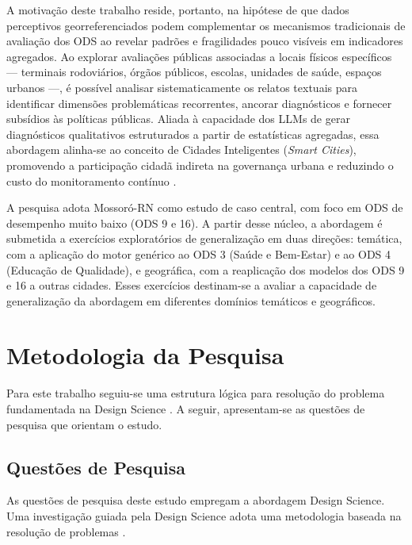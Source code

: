{A motivação deste trabalho reside, portanto, na hipótese de que dados
perceptivos georreferenciados podem complementar os mecanismos
tradicionais de avaliação dos ODS ao revelar padrões e fragilidades pouco
visíveis em indicadores agregados. Ao explorar avaliações públicas
associadas a locais físicos específicos --- terminais rodoviários, órgãos
públicos, escolas, unidades de saúde, espaços urbanos ---, é possível
analisar sistematicamente os relatos textuais para identificar dimensões
problemáticas recorrentes, ancorar diagnósticos e fornecer subsídios às políticas públicas. Aliada à capacidade dos
\gls{LLM}s de gerar diagnósticos qualitativos estruturados a partir de
estatísticas agregadas, essa abordagem alinha-se ao conceito de Cidades
Inteligentes (\textit{Smart Cities}), promovendo a participação cidadã
indireta na governança urbana e reduzindo o custo do monitoramento
contínuo \cite{fu2023}.

A pesquisa adota Mossoró-RN como estudo de caso central, com foco em ODS de
desempenho muito baixo (ODS 9 e 16). A partir desse núcleo,
a abordagem é submetida a exercícios exploratórios de generalização em duas
direções: temática, com a aplicação do motor genérico ao ODS 3 (Saúde e
Bem-Estar) e ao ODS 4 (Educação de Qualidade), e geográfica, com a reaplicação
dos modelos dos ODS 9 e 16 a outras cidades. Esses exercícios destinam-se a avaliar a capacidade de generalização da abordagem em diferentes
domínios temáticos e geográficos.

\section{Metodologia da Pesquisa}
\label{sec:metodologia-pesquisa}

Para este trabalho seguiu-se uma estrutura lógica para resolução do problema
fundamentada na Design Science \cite{wieringa2014,dresch2015}. A seguir,
apresentam-se as questões de pesquisa que orientam o estudo.

\subsection{Questões de Pesquisa}
\label{subsec:questoes-pesquisa}

As questões de pesquisa deste estudo empregam a abordagem Design Science. Uma investigação guiada pela
Design Science adota uma metodologia baseada na resolução de problemas
\cite{wieringa2009}.

}
